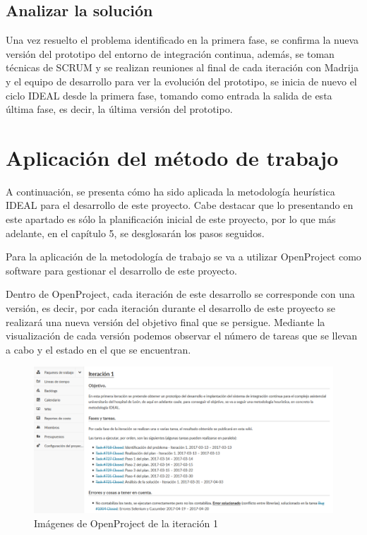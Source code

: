 \subsection{Analizar la solución}

Una vez resuelto el problema identificado en la primera fase, se confirma la nueva versión del prototipo del entorno de integración continua, además, se toman técnicas de SCRUM y se realizan reuniones al final de cada iteración con \ac{Madrija} y el equipo de desarrollo para ver la evolución del prototipo, se inicia de nuevo el ciclo IDEAL desde la primera fase, tomando como entrada la salida de esta última fase, es decir, la última versión del prototipo.

\section{Aplicación del método de trabajo}
A continuación, se presenta cómo ha sido aplicada la metodología heurística IDEAL para el desarrollo de este proyecto. Cabe destacar que lo presentando en este apartado es sólo la planificación inicial de este proyecto, por lo que más adelante, en el capítulo 5, se desglosarán los pasos seguidos.


Para la aplicación de la metodología de trabajo se va a utilizar OpenProject\cite{OpenProject} como software para gestionar el desarrollo de este proyecto.

Dentro de OpenProject, cada iteración de este desarrollo se corresponde con una versión, es decir, por cada iteración durante el desarrollo de este proyecto se realizará una nueva versión del objetivo final que se persigue. Mediante la visualización de cada versión podemos observar el número de tareas que se llevan a cabo y el estado en el que se encuentran.

\begin{figure}[!h]
\centering
   \includegraphics[width=16cm]{OpenProject1.PNG}
\caption{Imágenes de OpenProject de la iteración 1}
\end{figure}


